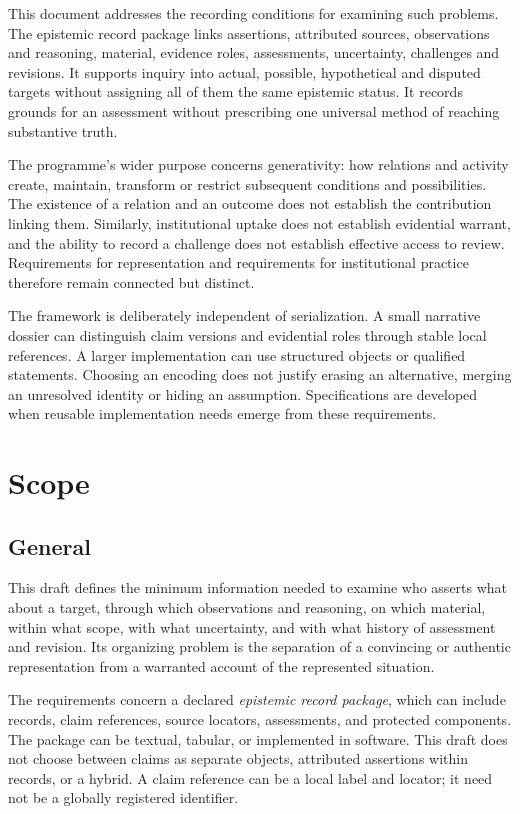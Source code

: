 \documentclass[11pt,a4paper]{article}
\begin{document}
This document addresses the recording conditions for examining such problems. The epistemic record package links assertions, attributed sources, observations and reasoning, material, evidence roles, assessments, uncertainty, challenges and revisions. It supports inquiry into actual, possible, hypothetical and disputed targets without assigning all of them the same epistemic status. It records grounds for an assessment without prescribing one universal method of reaching substantive truth.

The programme's wider purpose concerns generativity: how relations and activity create, maintain, transform or restrict subsequent conditions and possibilities. The existence of a relation and an outcome does not establish the contribution linking them. Similarly, institutional uptake does not establish evidential warrant, and the ability to record a challenge does not establish effective access to review. Requirements for representation and requirements for institutional practice therefore remain connected but distinct.

The framework is deliberately independent of serialization. A small narrative dossier can distinguish claim versions and evidential roles through stable local references. A larger implementation can use structured objects or qualified statements. Choosing an encoding does not justify erasing an alternative, merging an unresolved identity or hiding an assumption. Specifications are developed when reusable implementation needs emerge from these requirements.

\GSPmainmatter
\section{Scope}
\subsection{General}

This draft defines the minimum information needed to examine who asserts what about a target, through which observations and reasoning, on which material, within what scope, with what uncertainty, and with what history of assessment and revision. Its organizing problem is the separation of a convincing or authentic representation from a warranted account of the represented situation.

The requirements concern a declared \emph{epistemic record package}, which can include records, claim references, source locators, assessments, and protected components. The package can be textual, tabular, or implemented in software. This draft does not choose between claims as separate objects, attributed assertions within records, or a hybrid. A claim reference can be a local label and locator; it need not be a globally registered identifier.
\end{document}
